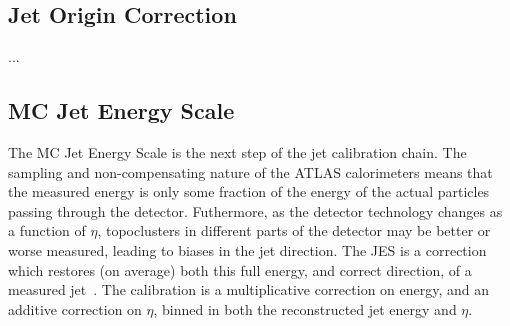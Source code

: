 

\subsection{Jet Origin Correction}

...

\subsection{MC Jet Energy Scale}
\label{jet-reconstruction:jet-calibration-mc-jet-energy-scale}

The MC Jet Energy Scale is the next step of the jet calibration chain. The sampling and non-compensating nature of the ATLAS calorimeters means that the measured energy is only some fraction of the energy of the actual particles passing through the detector. Futhermore, as the detector technology changes as a function of $\eta$, topoclusters in different parts of the detector may be better or worse measured, leading to biases in the jet direction. The JES is a correction which restores (on average) both this full energy, and correct direction, of a measured jet~\cite{JES2010}. The calibration is a multiplicative correction on energy, and an additive correction on $\eta$, binned in both the reconstructed jet energy and $\eta$.

